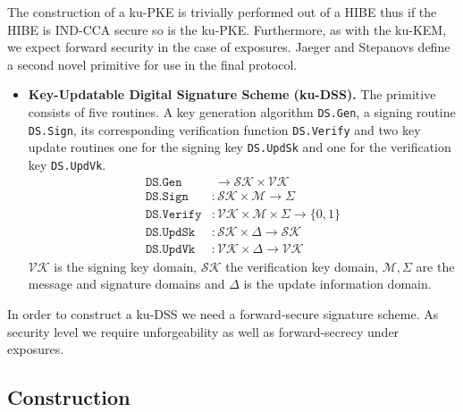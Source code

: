 \documentclass[11pt,a4paper,twoside,openright,bibliography=totoc]{scrbook}
\begin{document}
The construction of a ku-PKE is trivially performed out of a HIBE thus if
the HIBE is IND-CCA secure so is the ku-PKE. Furthermore, as with the
ku-KEM, we expect forward security in the case of exposures.
Jaeger and Stepanovs define a second novel primitive for use in the final protocol.
\begin{itemize}
\item \textbf{Key-Updatable Digital Signature Scheme (ku-DSS).} The primitive
  consists of five routines. A key generation algorithm
  \texttt{DS.Gen}, a signing routine \texttt{DS.Sign}, its corresponding
  verification function \texttt{DS.Verify} and two key update routines
  one for the signing key \texttt{DS.UpdSk} and one for the verification
  key \texttt{DS.UpdVk}.
  \begin{align*}
    \texttt{DS.Gen} & \  \rightarrow \mathcal{SK} \times \mathcal{VK} \\
    \texttt{DS.Sign} & : \mathcal{SK} \times \mathcal{M} \rightarrow \Sigma \\
    \texttt{DS.Verify} & : \mathcal{VK} \times \mathcal{M} \times \Sigma \rightarrow \{0,1\} \\
    \texttt{DS.UpdSk} & : \mathcal{SK} \times \Delta \rightarrow \mathcal{SK} \\
    \texttt{DS.UpdVk} & : \mathcal{VK} \times \Delta \rightarrow \mathcal{VK}
  \end{align*}
  $\mathcal{VK}$ is the signing key domain, $\mathcal{SK}$ the verification key
  domain, $\mathcal{M}, \Sigma$ are the message and signature domains and
  $\Delta$ is the update information domain.
\end{itemize}

In order to construct a ku-DSS we need a forward-secure signature scheme. As
security level we require unforgeability as well as forward-secrecy under
exposures. 

\subsection{Construction}
\label{sec:construction-1}
\end{document}
